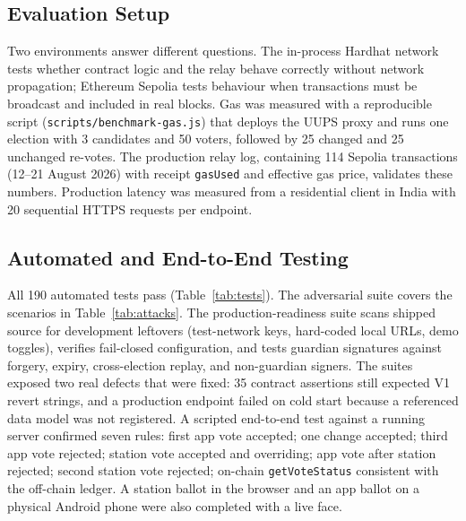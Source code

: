 \documentclass[conference]{IEEEtran}
\newcommand{\code}[1]{\texttt{\small #1}}
\begin{document}
\subsection{Evaluation Setup}
Two environments answer different questions. The in-process Hardhat network tests whether contract logic and the relay behave correctly without network propagation; Ethereum Sepolia tests behaviour when transactions must be broadcast and included in real blocks. Gas was measured with a reproducible script (\code{scripts/benchmark-gas.js}) that deploys the UUPS proxy and runs one election with 3 candidates and 50 voters, followed by 25 changed and 25 unchanged re-votes. The production relay log, containing 114 Sepolia transactions (12--21 August 2026) with receipt \code{gasUsed} and effective gas price, validates these numbers. Production latency was measured from a residential client in India with 20 sequential HTTPS requests per endpoint.

\subsection{Automated and End-to-End Testing}
All 190 automated tests pass (Table~\ref{tab:tests}). The adversarial suite covers the scenarios in Table~\ref{tab:attacks}. The production-readiness suite scans shipped source for development leftovers (test-network keys, hard-coded local URLs, demo toggles), verifies fail-closed configuration, and tests guardian signatures against forgery, expiry, cross-election replay, and non-guardian signers. The suites exposed two real defects that were fixed: 35 contract assertions still expected V1 revert strings, and a production endpoint failed on cold start because a referenced data model was not registered. A scripted end-to-end test against a running server confirmed seven rules: first app vote accepted; one change accepted; third app vote rejected; station vote accepted and overriding; app vote after station rejected; second station vote rejected; on-chain \code{getVoteStatus} consistent with the off-chain ledger. A station ballot in the browser and an app ballot on a physical Android phone were also completed with a live face.
\end{document}
